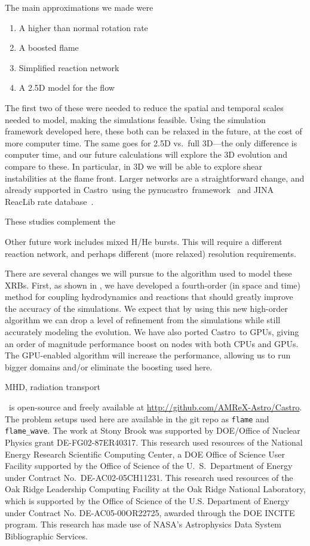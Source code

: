 \documentclass[preprint,times,tighten]{aastex63}
\newcommand{\castro}{{\sf Castro}}
\newcommand{\pynucastro}{{\sf pynucastro}}
\newcommand{\MarginPar}[1]{
    \marginpar{\vskip-\baselineskip%
               \raggedright%
               \tiny\sffamily%
               {\color{red}\hrule%
               \smallskip%
               #1\par%
               \smallskip%
               \hrule}}%
}
\begin{document}
The main approximations we made were
\begin{enumerate}
\item A higher than normal rotation rate
\item A boosted flame
\item Simplified reaction network
\item A 2.5D model for the flow
\end{enumerate}
The first two of these were needed to reduce the spatial and temporal
scales needed to model, making the simulations feasible.  Using the
simulation framework developed here, these both can be relaxed in the
future, at the cost of more computer time.  The same goes for 2.5D
vs.\ full 3D---the only difference is computer time, and our future
calculations will explore the 3D evolution and compare to these.  In particular,
in 3D we will be able to explore shear instabilities at the flame front.
Larger networks are a straightforward change, and already supported in
\castro\ using the \pynucastro\ framework~\citep{pynucastro} and JINA
ReacLib rate database~\citep{reaclib}.

These studies complement the\MarginPar{???? Finish this sentence}

Other future work includes mixed H/He bursts.  This will require a
different reaction network, and perhaps different (more relaxed)
resolution requirements.

There are several changes we will pursue to the algorithm used to
model these XRBs.  First, as shown in \citet{castro-sdc}, we have
developed a fourth-order (in space and time) method for coupling
hydrodynamics and reactions that should greatly improve the accuracy
of the simulations.  We expect that by using this new high-order
algorithm we can drop a level of refinement from the simulations while
still accurately modeling the evolution.  We have also ported
\castro\ to GPUs, giving an order of magnitude performance boost on
nodes with both CPUs and GPUs.  The GPU-enabled algorithm will
increase the performance, allowing us to run bigger domains and/or
eliminate the boosting used here.

MHD, radiation transport


\acknowledgements \castro\ is open-source and freely available at
\url{http://github.com/AMReX-Astro/Castro}.  The problem setups used
here are available in the git repo as {\tt flame} and {\tt
  flame\_wave}.  The work at Stony Brook was supported by DOE/Office
of Nuclear Physics grant DE-FG02-87ER40317.  This research used
resources of the National Energy Research Scientific Computing Center,
a DOE Office of Science User Facility supported by the Office of
Science of the U.~S.\ Department of Energy under Contract
No.\ DE-AC02-05CH11231.  This research used resources of the Oak Ridge
Leadership Computing Facility at the Oak Ridge National Laboratory,
which is supported by the Office of Science of the U.S. Department of
Energy under Contract No. DE-AC05-00OR22725, awarded through the DOE
INCITE program.  This research has made use of NASA's Astrophysics
Data System Bibliographic Services.
\end{document}
